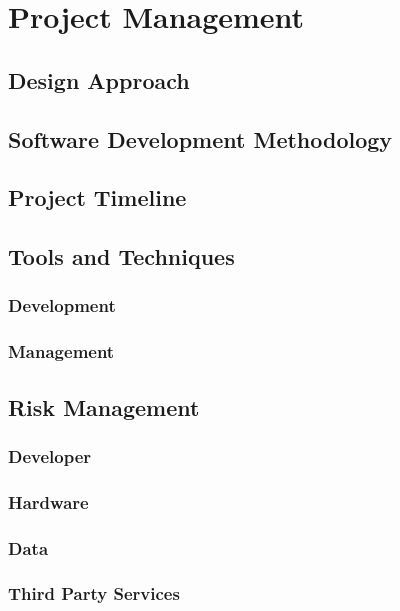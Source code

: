 \chapter{Project Management}
\label{Chapter:ProjectManagement}

\section{Design Approach}

\section{Software Development Methodology}

\section{Project Timeline}

\section{Tools and Techniques}
\subsection{Development}
\subsection{Management}

\section{Risk Management}
\subsection{Developer}
\subsection{Hardware}
\subsection{Data}
\subsection{Third Party Services}